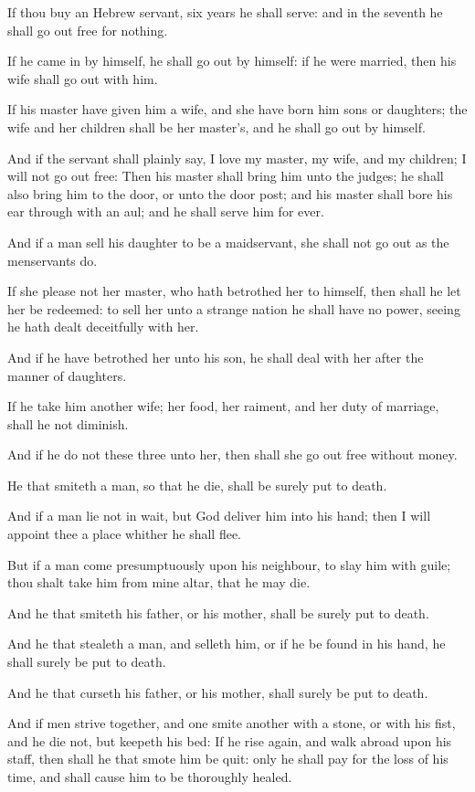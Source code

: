 \verse If thou buy an Hebrew servant, six years he shall serve: and in the seventh he shall go out free for nothing.

\verse If he came in by himself, he shall go out by himself: if he were married, then his wife shall go out with him.

\verse If his master have given him a wife, and she have born him sons or daughters; the wife and her children shall be her master's, and he shall go out by himself.

\verse And if the servant shall plainly say, I love my master, my wife, and my children; I will not go out free: \verse Then his master shall bring him unto the judges; he shall also bring him to the door, or unto the door post; and his master shall bore his ear through with an aul; and he shall serve him for ever.

\verse And if a man sell his daughter to be a maidservant, she shall not go out as the menservants do.

\verse If she please not her master, who hath betrothed her to himself, then shall he let her be redeemed: to sell her unto a strange nation he shall have no power, seeing he hath dealt deceitfully with her.

\verse And if he have betrothed her unto his son, he shall deal with her after the manner of daughters.

\verse If he take him another wife; her food, her raiment, and her duty of marriage, shall he not diminish.

\verse And if he do not these three unto her, then shall she go out free without money.

\verse He that smiteth a man, so that he die, shall be surely put to death.

\verse And if a man lie not in wait, but God deliver him into his hand; then I will appoint thee a place whither he shall flee.

\verse But if a man come presumptuously upon his neighbour, to slay him with guile; thou shalt take him from mine altar, that he may die.

\verse And he that smiteth his father, or his mother, shall be surely put to death.

\verse And he that stealeth a man, and selleth him, or if he be found in his hand, he shall surely be put to death.

\verse And he that curseth his father, or his mother, shall surely be put to death.

\verse And if men strive together, and one smite another with a stone, or with his fist, and he die not, but keepeth his bed: \verse If he rise again, and walk abroad upon his staff, then shall he that smote him be quit: only he shall pay for the loss of his time, and shall cause him to be thoroughly healed.

